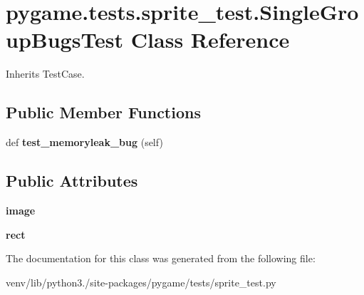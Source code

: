 \hypertarget{classpygame_1_1tests_1_1sprite__test_1_1_single_group_bugs_test}{}\section{pygame.\+tests.\+sprite\+\_\+test.\+Single\+Group\+Bugs\+Test Class Reference}
\label{classpygame_1_1tests_1_1sprite__test_1_1_single_group_bugs_test}


Inherits Test\+Case.

\subsection*{Public Member Functions}
\begin{DoxyCompactItemize}
\item 
\mbox{\label{classpygame_1_1tests_1_1sprite__test_1_1_single_group_bugs_test_a8a1b5b11a09049f575a6dbfd0125487b}} 
def {\bfseries test\+\_\+memoryleak\+\_\+bug} (self)
\end{DoxyCompactItemize}
\subsection*{Public Attributes}
\begin{DoxyCompactItemize}
\item 
\mbox{\label{classpygame_1_1tests_1_1sprite__test_1_1_single_group_bugs_test_a98b0ef9983eaa3e2c09344464d2fdc0b}} 
{\bfseries image}
\item 
\mbox{\label{classpygame_1_1tests_1_1sprite__test_1_1_single_group_bugs_test_ab8e6ee7b76bfc517982e4fa44f45360b}} 
{\bfseries rect}
\end{DoxyCompactItemize}


The documentation for this class was generated from the following file\+:\begin{DoxyCompactItemize}
\item 
venv/lib/python3./site-\/packages/pygame/tests/sprite\+\_\+test.\+py\end{DoxyCompactItemize}
